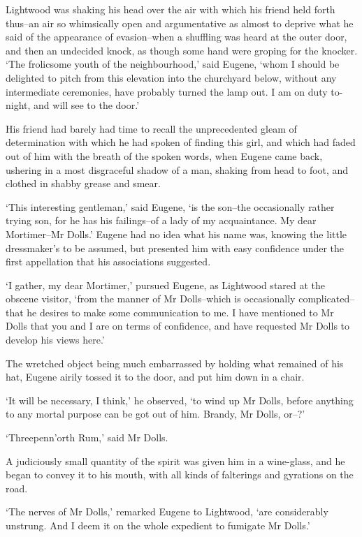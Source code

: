 Lightwood was shaking his head over the air with which his friend held
forth thus--an air so whimsically open and argumentative as almost to
deprive what he said of the appearance of evasion--when a shuffling was
heard at the outer door, and then an undecided knock, as though
some hand were groping for the knocker. ‘The frolicsome youth of the
neighbourhood,’ said Eugene, ‘whom I should be delighted to pitch from
this elevation into the churchyard below, without any intermediate
ceremonies, have probably turned the lamp out. I am on duty to-night,
and will see to the door.’

His friend had barely had time to recall the unprecedented gleam of
determination with which he had spoken of finding this girl, and which
had faded out of him with the breath of the spoken words, when Eugene
came back, ushering in a most disgraceful shadow of a man, shaking from
head to foot, and clothed in shabby grease and smear.

‘This interesting gentleman,’ said Eugene, ‘is the son--the
occasionally rather trying son, for he has his failings--of a lady of my
acquaintance. My dear Mortimer--Mr Dolls.’ Eugene had no idea what his
name was, knowing the little dressmaker’s to be assumed, but presented
him with easy confidence under the first appellation that his
associations suggested.

‘I gather, my dear Mortimer,’ pursued Eugene, as Lightwood stared at
the obscene visitor, ‘from the manner of Mr Dolls--which is occasionally
complicated--that he desires to make some communication to me. I have
mentioned to Mr Dolls that you and I are on terms of confidence, and
have requested Mr Dolls to develop his views here.’

The wretched object being much embarrassed by holding what remained
of his hat, Eugene airily tossed it to the door, and put him down in a
chair.

‘It will be necessary, I think,’ he observed, ‘to wind up Mr Dolls,
before anything to any mortal purpose can be got out of him. Brandy, Mr
Dolls, or--?’

‘Threepenn’orth Rum,’ said Mr Dolls.

A judiciously small quantity of the spirit was given him in a
wine-glass, and he began to convey it to his mouth, with all kinds of
falterings and gyrations on the road.

‘The nerves of Mr Dolls,’ remarked Eugene to Lightwood, ‘are
considerably unstrung. And I deem it on the whole expedient to fumigate
Mr Dolls.’

